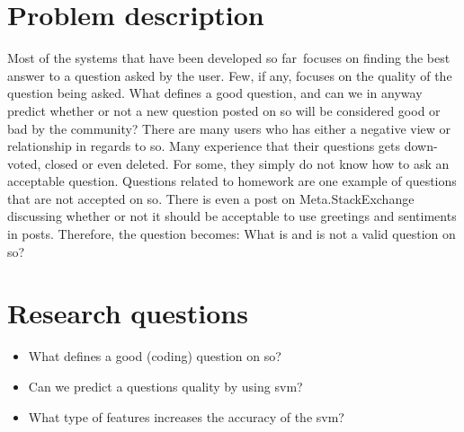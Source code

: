 \section{Problem description}
\label{sec:problem_description}
Most of the systems that have been developed so far~focuses on finding the best answer to a question asked by the user. 
Few, if any, focuses on the quality of the question being asked. 
What defines a good question, and can we in anyway predict whether or not a new question posted on \gls{so} will be considered good or bad by the community?
There are many users who has either a negative view or relationship in regards to \gls{so}.
Many experience that their questions gets down-voted, closed or even deleted. 
For some, they simply do not know how to ask an acceptable question.
Questions related to homework are one example of questions that are not accepted on \gls{so}.
There is even a post on Meta.StackExchange discussing whether or not it should be acceptable to use greetings and sentiments in posts\cite{CommunityWiki2016a}.
Therefore, the question becomes: What is and is not a valid question on \gls{so}?

\section{Research questions}
\label{sec:research_questions}

\begin{itemize}
	\item What defines a good (coding) question on \gls{so}?
	\item Can we predict a questions quality by using \gls{svm}?
	\item What type of features increases the accuracy of the \gls{svm}?
\end{itemize}

